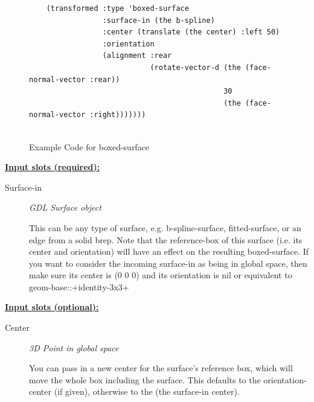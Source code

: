 \documentclass [11pt]{book}
\begin{document}
\begin{itemize}
\begin{figure}
\begin{lrbox}{\boxedverb}
\begin{minipage}{\linewidth}
{\begin{verbatim}
    (transformed :type 'boxed-surface
                 :surface-in (the b-spline)
                 :center (translate (the center) :left 50)
                 :orientation 
                 (alignment :rear 
                            (rotate-vector-d (the (face-normal-vector :rear))
                                             30
                                             (the (face-normal-vector :right)))))))
 
\end{verbatim}}
\end{minipage}
\end{lrbox}
\fbox{\usebox{\boxedverb}}

\caption{Example Code for boxed-surface}

\label{fig:example-code-boxed-surface}

\end{figure}





\textbf{
\underline{Input slots (required):}}

\begin{description}

\item [Surface-in]
\emph{GDL Surface object}

 This can be any type of surface, e.g. b-spline-surface, fitted-surface, or an edge from a solid brep.
Note that the reference-box of this surface (i.e. its center and orientation) will have an effect on the resulting
boxed-surface. If you want to consider the incoming surface-in as being in global space, then make sure its center
is (0 0 0) and its orientation is nil or equivalent to geom-base::+identity-3x3+




\end{description}






\textbf{
\underline{Input slots (optional):}}

\begin{description}

\item [Center]
\emph{3D Point in global space}

 You can pass in a new center for the surface's reference box,
which will move the whole box including the surface. This defaults to the
orientation-center (if given), otherwise to the (the surface-in center).





\end{description}
\end{itemize}
\end{document}
